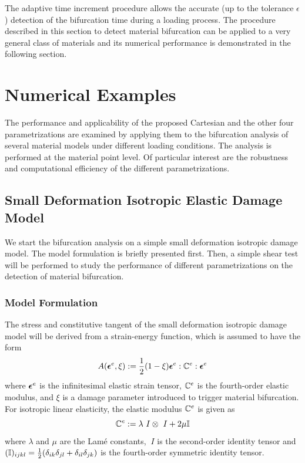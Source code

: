 \documentclass[12pt]{article}
\numberwithin{equation}{section}
\begin{document}
The adaptive time increment procedure allows the accurate (up to the
tolerance $\epsilon$) detection of the bifurcation time during a
loading process. The procedure described in this section to detect
material bifurcation can be applied to a very general class of
materials and its numerical performance is demonstrated in the
following section.

\section{Numerical Examples}
\label{sec:numerical-examples}

The performance and applicability of the proposed Cartesian and the
other four parametrizations are examined by applying them to the
bifurcation analysis of several material models under different
loading conditions. The analysis is performed at the material point
level. Of particular interest are the robustness and computational
efficiency of the different parametrizations.

\subsection{Small Deformation Isotropic Elastic Damage Model}
\label{subsec:isotropic}

We start the bifurcation analysis on a simple small deformation
isotropic damage model. The model formulation is briefly presented
first. Then, a simple shear test will be performed to study the
performance of different parametrizations on the detection of material
bifurcation.

\subsubsection{Model Formulation}

The stress and constitutive tangent of the small deformation isotropic
damage model will be derived from a strain-energy function, which is
assumed to have the form
\begin{equation}\label{eq:iso_psi}
  A({\boldsymbol{\epsilon}} ^e, \xi)
  :=
  \frac{1}{2} (1 - \xi)
  {\boldsymbol{\epsilon}} ^e : \mathbb{C}^e : {\boldsymbol{\epsilon}} ^e
\end{equation}
where ${\boldsymbol{\epsilon}}^e$ is the infinitesimal elastic strain tensor,
$\mathbb{C}^e$ is the fourth-order elastic modulus, and $\xi$ is a
damage parameter introduced to trigger material bifurcation. For
isotropic linear elasticity, the elastic modulus $\mathbb{C}^e$ is
given as
\begin{equation}
  \mathbb{C}^e := \lambda ~I \otimes ~I + 2\mu \mathbb{I}
\end{equation}
where $\lambda$ and $\mu$ are the Lam\'{e} constants, $~I$ is the
second-order identity tensor and $(\mathbb{I})_{ijkl} =
\frac{1}{2}(\delta_{ik}\delta_{jl} + \delta_{il}\delta_{jk})$ is the
fourth-order symmetric identity tensor.
\end{document}
